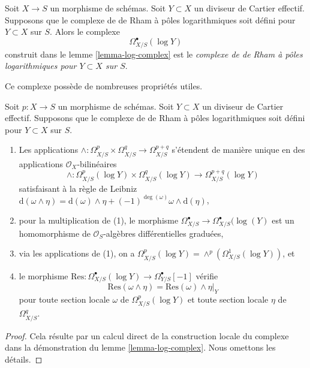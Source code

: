 \begin{definition}
\label{definition-log-complex}
Soit $X \to S$ un morphisme de schémas. Soit $Y \subset X$ un
diviseur de Cartier effectif. Supposons que le complexe de de Rham à pôles logarithmiques
soit défini pour $Y \subset X$ sur $S$. Alors le complexe
$$
\Omega^\bullet_{X/S}(\log Y)
$$
construit dans le lemme \ref{lemma-log-complex} est le
{\it complexe de de Rham à pôles logarithmiques pour $Y \subset X$ sur $S$}.
\end{definition}

\noindent
Ce complexe possède de nombreuses propriétés utiles.

\begin{lemma}
\label{lemma-multiplication-log}
Soit $p : X \to S$ un morphisme de schémas. Soit $Y \subset X$ un
diviseur de Cartier effectif. Supposons que le complexe de de Rham à pôles logarithmiques
soit défini pour $Y \subset X$ sur $S$.
\begin{enumerate}
\item Les applications
$\wedge : \Omega^p_{X/S} \times \Omega^q_{X/S} \to \Omega^{p + q}_{X/S}$
s'étendent de manière unique en des applications $\mathcal{O}_X$-bilinéaires
$$
\wedge : \Omega^p_{X/S}(\log Y) \times \Omega^q_{X/S}(\log Y)
\to \Omega^{p + q}_{X/S}(\log Y)
$$
satisfaisant à la règle de Leibniz
$
\text{d}(\omega \wedge \eta) = \text{d}(\omega) \wedge \eta +
(-1)^{\deg(\omega)} \omega \wedge \text{d}(\eta)$,
\item pour la multiplication de (1), le morphisme
$\Omega^\bullet_{X/S} \to \Omega^\bullet_{X/S}(\log(Y)$
est un homomorphisme de $\mathcal{O}_S$-algèbres différentielles graduées,
\item via les applications de (1), on a $\Omega^p_{X/S}(\log Y) =
\wedge^p(\Omega^1_{X/S}(\log Y))$, et
\item le morphisme
$\text{Res} : \Omega^\bullet_{X/S}(\log Y) \to \Omega^\bullet_{Y/S}[-1]$
vérifie
$$
\text{Res}(\omega \wedge \eta) = \text{Res}(\omega) \wedge \eta|_Y
$$
pour toute section locale $\omega$ de $\Omega^p_{X/S}(\log Y)$ et toute section locale $\eta$
de $\Omega^q_{X/S}$.
\end{enumerate}
\end{lemma}

\begin{proof}
Cela résulte par un calcul direct de la construction locale
du complexe dans la démonstration du lemme \ref{lemma-log-complex}.
Nous omettons les détails.
\end{proof}

